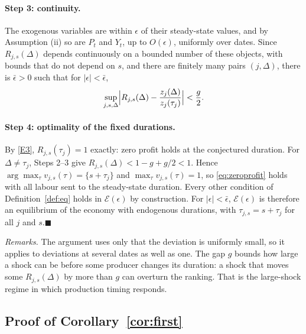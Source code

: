 \documentclass[11pt]{article}
\theoremstyle{definition}
\begin{document}
\paragraph{Step 3: continuity.}
The exogenous variables are within $\epsilon$ of their steady-state values, and by Assumption (ii)
so are $P_t$ and $Y_t$, up to $O(\epsilon)$, uniformly over dates. Since $R_{j,s}(\Delta)$ depends
continuously on a bounded number of these objects, with bounds that do not depend on $s$, and there
are finitely many pairs $(j,\Delta)$, there is $\bar\epsilon>0$ such that for $|\epsilon|<\bar\epsilon$,
\[
  \sup_{j,s,\Delta}\Bigl|R_{j,s}(\Delta)-\frac{z_j(\Delta)}{z_j(\tau_j)}\Bigr|<\frac g2 .
\]

\paragraph{Step 4: optimality of the fixed durations.}
By \eqref{E3}, $R_{j,s}(\tau_j)=1$ exactly: zero profit holds at the conjectured duration. For
$\Delta\neq\tau_j$, Steps 2--3 give $R_{j,s}(\Delta)<1-g+g/2<1$. Hence
$\arg\max_\tau v_{j,s}(\tau)=\{s+\tau_j\}$ and $\max_\tau v_{j,s}(\tau)=1$, so
\eqref{eq:zeroprofit} holds with all labour sent to the steady-state duration. Every other
condition of Definition~\ref{def:eq} holds in $\mathcal E(\epsilon)$ by construction. For
$|\epsilon|<\bar\epsilon$, $\mathcal E(\epsilon)$ is therefore an equilibrium of the economy with
endogenous durations, with $\tau_{j,s}=s+\tau_j$ for all $j$ and $s$.\hfill$\blacksquare$

\medskip
\noindent\emph{Remarks.} The argument uses only that the deviation is uniformly small, so it applies
to deviations at several dates as well as one. The gap $g$ bounds how large a shock can be before
some producer changes its duration: a shock that moves some $R_{j,s}(\Delta)$ by more than $g$ can
overturn the ranking. That is the large-shock regime in which production timing responds.

\subsection{Proof of Corollary~\ref{cor:first}}\label{app:pf_first}
\end{document}

